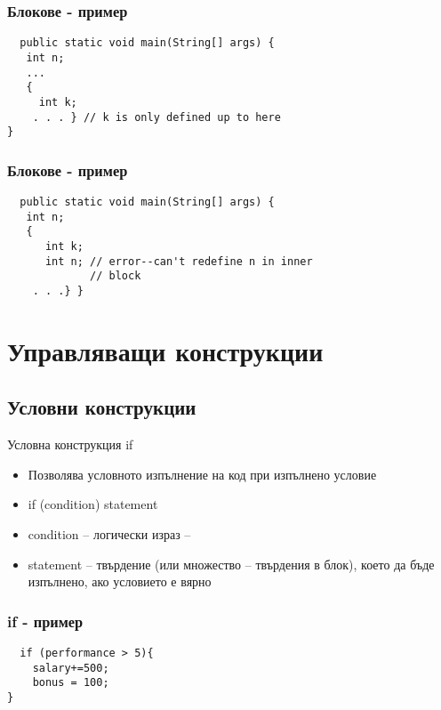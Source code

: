\documentclass{beamer}
\begin{document}
\begin{frame}[fragile]
  \transdissolve
  \frametitle{Блокове - пример}
\begin{lstlisting}
  public static void main(String[] args) {
   int n;
   ...
   {
     int k;
    . . . } // k is only defined up to here
}
\end{lstlisting}
\end{frame}

\begin{frame}[fragile]
  \frametitle{Блокове - пример}
  \transdissolve
\begin{lstlisting}
  public static void main(String[] args) {
   int n;
   {
      int k;
      int n; // error--can't redefine n in inner
             // block
    . . .} }

\end{lstlisting}
\end{frame}

\section{Управляващи конструкции}

\subsection{Условни конструкции}

\begin{frame}{Условна конструкция if}
  \transdissolve
  \begin{itemize}
  \item Позволява условното изпълнение на код при изпълнено условие
  \item   if (condition) statement
  \item  condition – логически израз
    –
  \item  statement – твърдение (или множество
    –
    твърдения в блок), което да бъде
    изпълнено, ако условието е вярно

  \end{itemize}
\end{frame}


\begin{frame}[fragile]
  \frametitle{if - пример}
  \transdissolve
\begin{lstlisting}
  if (performance > 5){
    salary+=500;
    bonus = 100;
}

\end{lstlisting}
\end{frame}
\end{document}
